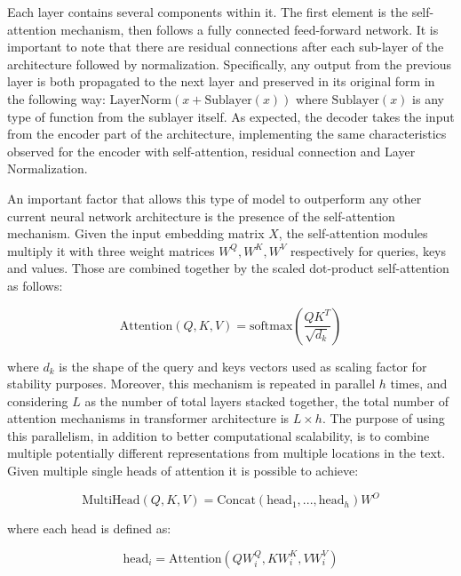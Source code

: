 Each layer contains several components within it. The first element is the self-attention mechanism, then follows a fully connected feed-forward network. It is important to note that there are residual connections after each sub-layer of the architecture followed by normalization. Specifically, any output from the previous layer is both propagated to the next layer and preserved in its original form in the following way: $\text{LayerNorm}(x + \text{Sublayer}(x))$ where $\text{Sublayer}(x)$ is any type of function from the sublayer itself. As expected, the decoder takes the input from the encoder part of the architecture, implementing the same characteristics observed for the encoder with self-attention, residual connection and Layer Normalization.

An important factor that allows this type of model to outperform any other current neural network architecture is the presence of the self-attention mechanism. Given the input embedding matrix $X$, the self-attention modules multiply it with three weight matrices $W^Q, W^K, W^V$ respectively for queries, keys and values. Those are combined together by the scaled dot-product self-attention as follows:

\begin{equation*}
    \text{Attention} (Q, K, V) = \text{softmax} \left ( \frac{QK^T}{\sqrt{d_k}} \right )
\end{equation*}

where $d_k$ is the shape of the query and keys vectors used as scaling factor for stability purposes. Moreover, this mechanism is repeated in parallel $h$ times, and considering $L$ as the number of total layers stacked together, the total number of attention mechanisms in transformer architecture is $L \times h$. The purpose of using this parallelism, in addition to better computational scalability, is to combine multiple potentially different representations from multiple locations in the text. Given multiple single heads of attention it is possible to achieve:  

\begin{equation*}
    \text{MultiHead} (Q, K, V) = \text{Concat} (\text{head}_1, ..., \text{head}_h) W^O
\end{equation*}

where each head is defined as:

\begin{equation*}
    \text{head}_i = \text{Attention} (QW^{Q}_{i}, KW^{K}_{i}, VW^{V}_{i})
\end{equation*}

